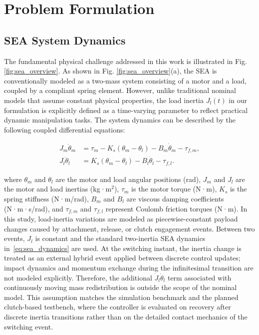 \documentclass[lettersize,journal]{IEEEtran}
\begin{document}
\section{Problem Formulation}

\subsection{SEA System Dynamics}

The fundamental physical challenge addressed in this work is illustrated in Fig. \ref{fig:sea_overview}. As shown in Fig. \ref{fig:sea_overview}(a), the SEA is conventionally modeled as a two-mass system consisting of a motor and a load, coupled by a compliant spring element. However, unlike traditional nominal models that assume constant physical properties, the load inertia $J_l(t)$ in our formulation is explicitly defined as a time-varying parameter to reflect practical dynamic manipulation tasks. The system dynamics can be described by the following coupled differential equations:

\begin{equation}
\begin{aligned}
J_m \ddot{\theta}_m &= \tau_m - K_s(\theta_m - \theta_l) - B_m\dot{\theta}_m - \tau_{f,m}, \\
J_l \ddot{\theta}_l &= K_s(\theta_m - \theta_l) - B_l\dot{\theta}_l - \tau_{f,l}.
\end{aligned}
\label{eq:sea_dynamics}
\end{equation}

\noindent where $\theta_m$ and $\theta_l$ are the motor and load angular positions (rad), $J_m$ and $J_l$ are the motor and load inertias (kg·m$^2$), $\tau_m$ is the motor torque (N·m), $K_s$ is the spring stiffness (N·m/rad), $B_m$ and $B_l$ are viscous damping coefficients (N·m·s/rad), and $\tau_{f,m}$ and $\tau_{f,l}$ represent Coulomb friction torques (N·m).
In this study, load-inertia variations are modeled as piecewise-constant payload changes caused by attachment, release, or clutch engagement events. Between two events, $J_l$ is constant and the standard two-inertia SEA dynamics in~\eqref{eq:sea_dynamics} are used. At the switching instant, the inertia change is treated as an external hybrid event applied between discrete control updates; impact dynamics and momentum exchange during the infinitesimal transition are not modeled explicitly. Therefore, the additional $\dot{J}_l\dot{\theta}_l$ term associated with continuously moving mass redistribution is outside the scope of the nominal model. This assumption matches the simulation benchmark and the planned clutch-based testbench, where the controller is evaluated on recovery after discrete inertia transitions rather than on the detailed contact mechanics of the switching event.
\end{document}
